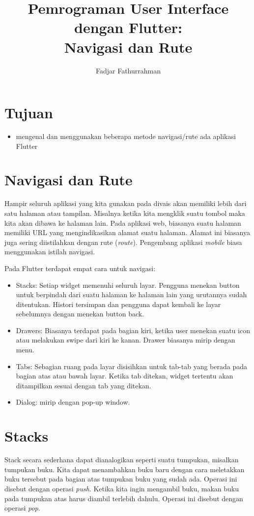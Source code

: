 \documentclass[a4paper,11pt]{article} %
\begin{document}
\title{Pemrograman User Interface dengan Flutter:\\
Navigasi dan Rute}
\author{Fadjar Fathurrahman}
\date{}
\maketitle

\section{Tujuan}

\begin{itemize}
\item mengenal dan menggunakan beberapa metode navigasi/rute ada aplikasi Flutter
\end{itemize}

\section{Navigasi dan Rute}
Hampir seluruh aplikasi yang kita gunakan pada divais akan memiliki lebih dari satu
halaman atau tampilan. Misalnya ketika kita mengklik suatu tombol maka kita akan
dibawa ke halaman lain. Pada aplikasi web, biasanya suatu halaman memiliki URL
yang mengindikasikan alamat suatu halaman. Alamat ini biasanya juga sering diistilahkan
dengan rute (\textit{route}). Pengembang aplikasi \textit{mobile} biasa menggunakan
istilah navigasi.

Pada Flutter terdapat empat cara untuk navigasi:
\begin{itemize}
\item Stacks: Setiap widget memenuhi seluruh layar. Pengguna menekan button untuk
berpindah dari suatu halaman ke halaman lain yang urutannya sudah ditentukan.
Histori tersimpan dan pengguna dapat kembali ke layar sebelumnya dengan menekan button
back.
\item Drawers: Biasanya terdapat pada bagian kiri, ketika user menekan suatu icon atau
melakukan swipe dari kiri ke kanan. Drawer biasanya mirip dengan menu.
\item Tabs: Sebagian ruang pada layar disisihkan untuk tab-tab yang berada pada bagian
atas atau bawah layar. Ketika tab ditekan, widget tertentu akan ditampilkan sesuai dengan
tab yang ditekan.
\item Dialog: mirip dengan pop-up window.
\end{itemize}


\section{Stacks}
Stack secara sederhana dapat dianalogikan seperti suatu tumpukan, misalkan tumpukan
buku. Kita dapat menambahkan buku baru dengan cara meletakkan buku tersebut pada
bagian atas tumpukan buku yang sudah ada. Operasi ini disebut dengan operasi \textit{push}.
Ketika kita ingin mengambil buku, makan buku pada tumpukan atas harus diambil terlebih dahulu.
Operasi ini disebut dengan operasi \textit{pop}.
\end{document}

